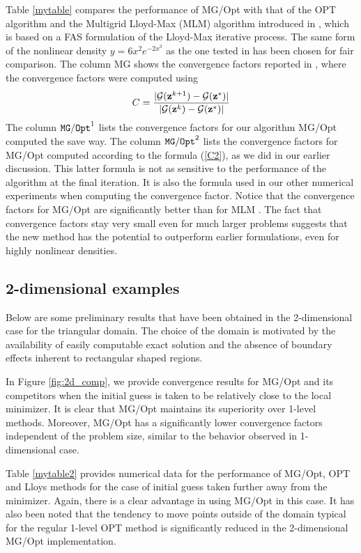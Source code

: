 \documentclass{siamltex}
\newcommand{\ds}{\displaystyle}
\begin{document}
Table  \ref{mytable} compares the performance of MG/Opt with that of the OPT algorithm and the Multigrid Lloyd-Max (MLM) algorithm  introduced in \cite{yavneh03}, which is based on a FAS formulation of the Lloyd-Max iterative process. The same form of the nonlinear density $y=6x^{2}e^{-2x^{3}}$ as the one tested in \cite{yavneh03} has been chosen for fair comparison.  The column MG\cite{yavneh03} shows the convergence factors reported in \cite{yavneh03}, where the convergence factors were computed using
\begin{equation}
\ds C=\frac{|\cg(\bz^{k+1})-\cg(\bz^{*})| }{|\cg(\bz^{k})-\cg(\bz^{*})| }
\label{C1}
\end{equation}
The column ${\tt MG/Opt}^{1}$ lists the convergence factors for our algorithm MG/Opt computed the save way. The column ${\tt MG/Opt}^{2}$ lists the convergence factors for MG/Opt computed according to the formula (\ref{C2}), as we did in our earlier discussion. This latter formula is not as sensitive to the performance of the algorithm at the final iteration. It is also the formula used in our other numerical experiments when computing the convergence factor. Notice that the convergence factors for MG/Opt are significantly better than for MLM \cite{yavneh03}. The fact that convergence factors stay very small even for much larger problems  suggests that the new method has the potential to outperform earlier formulations, %
even for highly nonlinear densities.

\subsection{2-dimensional examples}
Below are some preliminary results that have been obtained in the 2-dimensional %
case for the triangular domain. The choice of the domain is motivated by the availability of easily computable exact solution and the absence of boundary effects inherent to rectangular shaped regions.%

In Figure \ref{fig:2d_comp}, we provide convergence results for MG/Opt and its competitors when the %
initial guess is taken to be relatively close to the local minimizer. It is clear that MG/Opt maintains its superiority over 1-level methods. Moreover, MG/Opt has a significantly lower convergence factors independent of the problem size, similar to the behavior observed in 1-dimensional case. 

Table %
\ref{mytable2} provides numerical data for the performance of MG/Opt, OPT and Lloys methods for the case of initial guess taken further away from the minimizer. Again, there is a clear advantage in using MG/Opt in this case. It has also been noted that the tendency to move points outside of the domain typical for the regular 1-level OPT method is significantly reduced in the 2-dimensional MG/Opt implementation.
\end{document}
